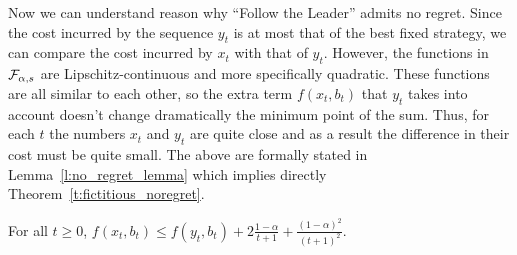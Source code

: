 Now we can understand reason why \enquote{Follow the Leader}
admits no regret. Since the cost incurred by the sequence $y_t$ is at most that
of the best fixed strategy, we can compare the cost incurred by $x_t$ with
that of $y_t$.  However, the functions in $\mathcal{F}_{\alpha,s}$ are
Lipschitz-continuous and more specifically quadratic.
These functions are all similar to each other, so the extra
term $f(x_t,b_t)$ that $y_t$ takes into account doesn't change
dramatically the minimum point of the sum. Thus, for each $t$ the
numbers $x_t$ and $y_t$ are quite close and as a result the
difference in their cost must be quite small. The above are
formally stated in Lemma~\ref{l:no_regret_lemma} which implies
directly Theorem~\ref{t:fictitious_noregret}.
\begin{lemma}\label{l:no_regret_lemma}
  For all $t\geq 0$,
  \(
    f(x_t,b_t) \leq f(y_t,b_t) + 2\frac{1-\alpha}{t+1} +
    \frac{(1-\alpha)^2}{(t+1)^2}
  \).
\end{lemma}

